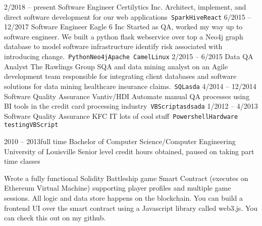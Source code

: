 \documentclass[9pt]{developercv} %
\begin{document}
\begin{entrylist}
	\entry
		{2/2018 -- present}
		{Software Engineer}
		{Certilytics Inc.}
		{Architect, implement, and direct software development for our web applications\ \texttt{Spark}\slashsep\texttt{Hive}\slashsep\texttt{React}}
	\entry
		{6/2015 -- 12/2017}
		{Software Engineer}
		{Eagle 6 Inc}
		{Started as QA, worked my way up to software engineer. We built a python flask webservice over top a Neo4j graph database to model software infrastructure identify risk associated with introducing change.\ \texttt{Python}\slashsep\texttt{Neo4j}\slashsep\texttt{Apache Camel}\slashsep\texttt{Linux}}
	\entry
		{2/2015 -- 6/2015}
		{Data QA Analyst}
		{The Rawlings Group}
		{SQA and data mining analyst on an Agile development team responsible for integrating client databases and software solutions for data mining healthcare insurance claims.\ \texttt{SQL}\slashsep\texttt{asda}}
	\entry
		{4/2014 -- 12/2014}
		{Software Quality Assurance}
		{Vantiv/HDI}
		{Automate manual QA processes using BI tools in the credit card processing industry\ \texttt{VBScript}\slashsep\texttt{asdsada}}
	\entry
		{1/2012 -- 4/2013}
		{Software Quality Assurance}
		{KFC IT}
		{lots of cool stuff\ \texttt{Powershell}\slashsep\texttt{Hardware testing}\slashsep\texttt{VBScript}}
\end{entrylist}



\begin{entrylist}
	\entry
		{2010 -- 2013\footnotesize{full time}}
		{Bachelor of Computer Science/Computer Engineering}
		{University of Louisville}
		{Senior level credit hours obtained, paused on taking part time classes}
\end{entrylist}

\begin{minipage}[t]{0.6\textwidth} 
	\vspace{-\baselineskip} %
	
	
	Wrote a fully functional Solidity Battleship game Smart Contract (executes on Ethereum Virtual Machine) supporting player profiles and multiple game sessions. All logic and data store happens on the blockchain. You can build a frontend UI over the smart contract using a Javascript library called web3.js. You can check this out on my github.\ %
\end{minipage}
\end{document}

